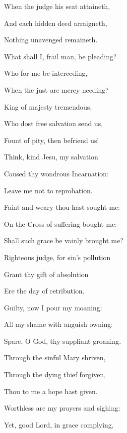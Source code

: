 \begin{multicols}{2}
\begin{hangparas}{1.25em}{1}
When the judge his seat attaineth,\par\noindent
And each hidden deed arraigneth,\par\noindent
Nothing unavenged remaineth.\\
\par\noindent
What shall I, frail man, be pleading?\par\noindent
Who for me be interceding,\par\noindent
When the just are mercy needing?\\
\par\noindent
King of majesty tremendous,\par\noindent
Who dost free salvation send us,\par\noindent
Fount of pity, then befriend us!\\
\par\noindent
Think, kind Jesu, my salvation\par\noindent
Caused thy wondrous Incarnation:\par\noindent
Leave me not to reprobation.\\
\par\noindent
Faint and weary thou hast sought me:\par\noindent
On the Cross of suffering bought me:\par\noindent
Shall such grace be vainly brought me?\\
\par\noindent
Righteous judge, for sin's pollution\par\noindent
Grant thy gift of absolution\par\noindent
Ere the day of retribution.\\
\par\noindent
Guilty, now I pour my moaning:\par\noindent
All my shame with anguish owning:\par\noindent
Spare, O God, thy suppliant groaning.\\
\par\noindent
Through the sinful Mary shriven,\par\noindent
Through the dying thief forgiven,\par\noindent
Thou to me a hope hast given.\\
\par\noindent
Worthless are my prayers and sighing:\par\noindent
Yet, good Lord, in grace complying,\par\noindent

\end{hangparas}
\end{multicols}
